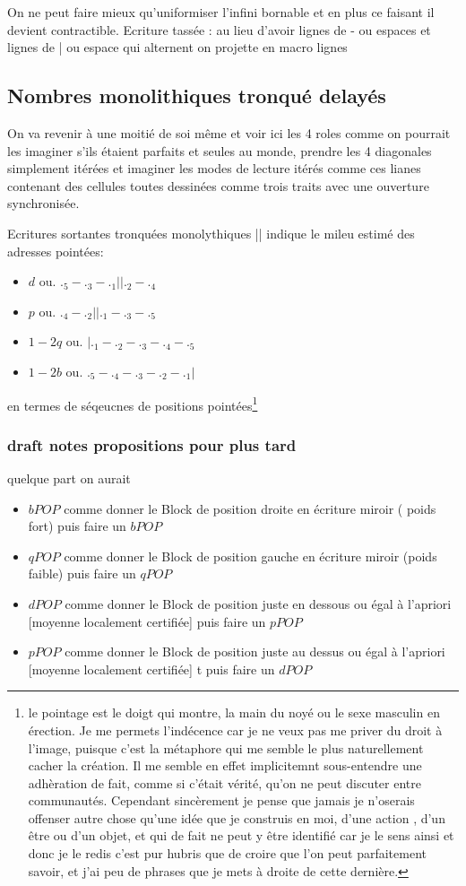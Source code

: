 \documentclass{article}
\begin{document}
On ne peut faire mieux qu'uniformiser l'infini  bornable et en plus ce faisant il devient contractible.
Ecriture tassée :  au lieu  d'avoir lignes de - ou espaces et lignes de | ou espace qui alternent  on projette en macro lignes 


 \subsection{ Nombres monolithiques tronqué delayés}
 On va revenir à une moitié de soi même 
 et voir ici les 4 roles comme on pourrait les imaginer s'ils étaient parfaits et seules au monde, prendre les 4 diagonales 
  simplement itérées et imaginer les modes de lecture itérés comme ces lianes contenant des cellules toutes dessinées comme trois traits avec une ouverture synchronisée.
 
 Ecritures sortantes tronquées monolythiques || indique le mileu estimé des adresses pointées:
 \begin{itemize}
 \item $d$   ou.     $._5-._3-._1 ||._2-._4$ 
 \item $p$ ou.     $._4-._2||._1-._3-._5$ 
 \item $1-2 q$ ou.     $|._1-._2-._3-._4-._5$ 
 \item $1-2 b$ ou.     $._5-._4-._3-._2-._1|$ 
 \end{itemize} 

en termes de séqeucnes de positions pointées\footnote{le pointage est le doigt qui montre, la main du noyé ou le sexe masculin en érection. Je me permets l'indécence car je  ne veux pas me priver du droit à l'image, puisque c'est la métaphore qui me semble le plus naturellement cacher la création. Il me semble en effet implicitemnt sous-entendre  une  adhèration  de fait, comme si c'était vérité, qu'on ne peut discuter entre communautés. Cependant  sincèrement je pense que jamais je n'oserais offenser autre chose  qu'une idée que je construis en moi, d'une action , d'un être ou  d'un objet,  et qui de fait ne peut y être identifié car  je le sens ainsi et donc je le redis c'est pur hubris que de croire que l'on peut parfaitement savoir, et j'ai peu de phrases que je mets à droite de cette dernière.} 
 
\subsubsection{draft notes propositions pour plus tard} 
quelque part on aurait 
\begin{itemize}
\item $bPOP$ comme donner le Block de position droite en écriture miroir ( poids fort) puis faire un $bPOP$
\item $qPOP$ comme donner le Block de position gauche en écriture miroir  (poids  faible) puis faire un $qPOP$
\item $dPOP$ comme donner le Block de position juste en dessous ou égal à  l'apriori [moyenne localement certifiée]  puis faire un $pPOP$ 
\item $pPOP$ comme donner le Block de position  juste au dessus ou égal à  l'apriori [moyenne localement certifiée] t puis faire un $dPOP$
\end{itemize} 
\end{document}
